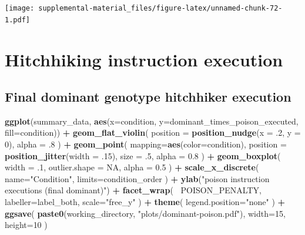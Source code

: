 \documentclass[]{book}
\newenvironment{Shaded}{\begin{snugshade}}{\end{snugshade}}
\newcommand{\DataTypeTok}[1]{\textcolor[rgb]{0.13,0.29,0.53}{#1}}
\newcommand{\DecValTok}[1]{\textcolor[rgb]{0.00,0.00,0.81}{#1}}
\newcommand{\FloatTok}[1]{\textcolor[rgb]{0.00,0.00,0.81}{#1}}
\newcommand{\KeywordTok}[1]{\textcolor[rgb]{0.13,0.29,0.53}{\textbf{#1}}}
\newcommand{\NormalTok}[1]{#1}
\newcommand{\OperatorTok}[1]{\textcolor[rgb]{0.81,0.36,0.00}{\textbf{#1}}}
\newcommand{\OtherTok}[1]{\textcolor[rgb]{0.56,0.35,0.01}{#1}}
\newcommand{\StringTok}[1]{\textcolor[rgb]{0.31,0.60,0.02}{#1}}
\begin{document}
\texttt{[image: supplemental-material\_files/figure-latex/unnamed-chunk-72-1.pdf]}

\hypertarget{hitchhiking-instruction-execution}{%
\section{Hitchhiking instruction execution}\label{hitchhiking-instruction-execution}}

\hypertarget{final-dominant-genotype-hitchhiker-execution}{%
\subsection{Final dominant genotype hitchhiker execution}\label{final-dominant-genotype-hitchhiker-execution}}

\begin{Shaded}
\begin{Highlighting}[]
\KeywordTok{ggplot}\NormalTok{(summary_data, }\KeywordTok{aes}\NormalTok{(}\DataTypeTok{x=}\NormalTok{condition, }\DataTypeTok{y=}\NormalTok{dominant_times_poison_executed, }\DataTypeTok{fill=}\NormalTok{condition)) }\OperatorTok{+}
\StringTok{  }\KeywordTok{geom_flat_violin}\NormalTok{(}
    \DataTypeTok{position =} \KeywordTok{position_nudge}\NormalTok{(}\DataTypeTok{x =} \FloatTok{.2}\NormalTok{, }\DataTypeTok{y =} \DecValTok{0}\NormalTok{),}
    \DataTypeTok{alpha =} \FloatTok{.8}
\NormalTok{  ) }\OperatorTok{+}
\StringTok{  }\KeywordTok{geom_point}\NormalTok{(}
    \DataTypeTok{mapping=}\KeywordTok{aes}\NormalTok{(}\DataTypeTok{color=}\NormalTok{condition),}
    \DataTypeTok{position =} \KeywordTok{position_jitter}\NormalTok{(}\DataTypeTok{width =} \FloatTok{.15}\NormalTok{),}
    \DataTypeTok{size =} \FloatTok{.5}\NormalTok{,}
    \DataTypeTok{alpha =} \FloatTok{0.8}
\NormalTok{  ) }\OperatorTok{+}
\StringTok{  }\KeywordTok{geom_boxplot}\NormalTok{(}
    \DataTypeTok{width =} \FloatTok{.1}\NormalTok{,}
    \DataTypeTok{outlier.shape =} \OtherTok{NA}\NormalTok{,}
    \DataTypeTok{alpha =} \FloatTok{0.5}
\NormalTok{  ) }\OperatorTok{+}
\StringTok{  }\KeywordTok{scale_x_discrete}\NormalTok{(}
    \DataTypeTok{name=}\StringTok{"Condition"}\NormalTok{,}
    \DataTypeTok{limits=}\NormalTok{condition_order}
\NormalTok{  ) }\OperatorTok{+}
\StringTok{  }\KeywordTok{ylab}\NormalTok{(}\StringTok{"poison instruction executions (final dominant)"}\NormalTok{) }\OperatorTok{+}
\StringTok{  }\KeywordTok{facet_wrap}\NormalTok{(}
    \OperatorTok{~}\NormalTok{POISON_PENALTY,}
    \DataTypeTok{labeller=}\NormalTok{label_both,}
    \DataTypeTok{scale=}\StringTok{"free_y"}
\NormalTok{  ) }\OperatorTok{+}
\StringTok{  }\KeywordTok{theme}\NormalTok{(}
    \DataTypeTok{legend.position=}\StringTok{"none"}
\NormalTok{  ) }\OperatorTok{+}
\StringTok{  }\KeywordTok{ggsave}\NormalTok{(}
    \KeywordTok{paste0}\NormalTok{(working_directory, }\StringTok{"plots/dominant-poison.pdf"}\NormalTok{),}
    \DataTypeTok{width=}\DecValTok{15}\NormalTok{,}
    \DataTypeTok{height=}\DecValTok{10}
\NormalTok{  )}
\end{Highlighting}
\end{Shaded}
\end{document}
